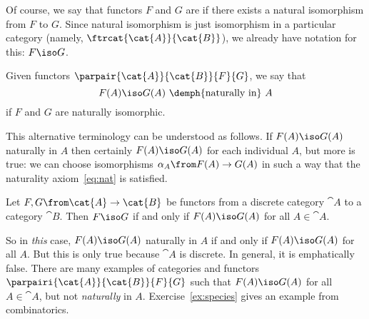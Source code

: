 Of course, we say that functors $F$ and $G$ are  if there exists a natural isomorphism from $F$ to $G$.  Since
natural isomorphism is just isomorphism in a particular category (namely,
$\ftrcat{\cat{A}}{\cat{B}}$), we already have notation for this: $F \iso
G$.%
%
%

\begin{defn}	
\label{defn:nat-in}
Given functors $\parpair{\cat{A}}{\cat{B}}{F}{G}$, we say that
% 
\[
F(A) \iso G(A) \text{ \demph{naturally in} } A 
%
\index{naturally}
%
\]
if $F$ and $G$ are naturally isomorphic.  
\end{defn}

This alternative terminology can be understood as follows.  If $F(A) \iso
G(A)$ naturally in $A$ then certainly $F(A) \iso G(A)$ for each individual
$A$, but more is true: we can choose isomorphisms $\alpha_A\from F(A) \to
G(A)$ in such a way that the naturality axiom~\eqref{eq:nat} is satisfied.

\begin{example}
Let $F, G\from \cat{A} \to \cat{B}$ be functors from a discrete%
%
%
category $\cat{A}$ to a category $\cat{B}$.  Then $F \iso G$ if and only if
$F(A) \iso G(A)$ for all $A \in \cat{A}$.

So in \emph{this} case, $F(A) \iso G(A)$ naturally in $A$ if and only if
$F(A) \iso G(A)$ for all $A$.  But this is only true because $\cat{A}$ is
discrete.  In general, it is emphatically false.  There are many examples
of categories and functors $\parpairi{\cat{A}}{\cat{B}}{F}{G}$ such that
$F(A) \iso G(A)$ for all $A \in \cat{A}$, but not \emph{naturally} in $A$.
Exercise~\ref{ex:species} gives an example from combinatorics.
\end{example}

